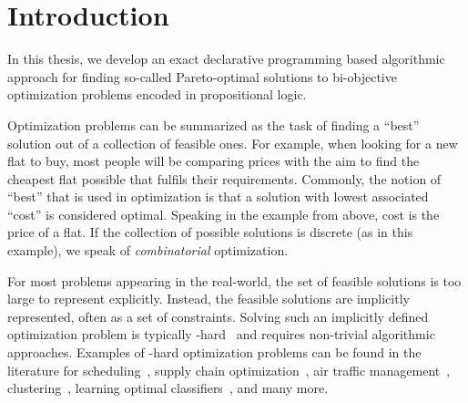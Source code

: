\chapter{Introduction\label{chap:intro}}

In this thesis, we develop an exact declarative programming based algorithmic approach for finding so-called Pareto-optimal solutions to bi-objective optimization problems encoded in propositional logic.

Optimization problems can be summarized as the task of finding a ``best'' solution out of a collection of feasible ones.
For example, when looking for a new flat to buy, most people will be comparing prices with the aim to find the cheapest flat possible that fulfils their requirements.
Commonly, the notion of ``best'' that is used in optimization is that a solution with lowest associated ``cost'' is considered optimal.
Speaking in the example from above, cost is the price of a flat.
If the collection of possible solutions is discrete (as in this example), we speak of \emph{combinatorial} optimization.

For most problems appearing in the real-world, the set of feasible solutions is too large to represent explicitly.
Instead, the feasible solutions are implicitly represented, often as a set of constraints.
Solving such an implicitly defined optimization problem is typically \NP-hard~\autocite{AroraBarak2009-complexity} and requires non-trivial algorithmic approaches.
Examples of \NP-hard optimization problems can be found in the literature for scheduling~\autocites{DBLP:conf/cp/Stojadinovic14,DBLP:conf/cpaior/BofillGSV15,DBLP:journals/ior/Solomon87,DBLP:journals/candie/AkyolB07}, supply chain optimization~\autocite{DBLP:journals/cce/Papageorgiou09}, air traffic management~\autocites{DBLP:journals/ior/BertsimasLO11,RichardsHow2002Aircrafttrajectoryplanning}, clustering~\autocite{DBLP:journals/ai/DaoDV17,DBLP:conf/sdm/DavidsonRS10}, learning optimal classifiers~\autocites{DBLP:conf/cp/MaliotovM18,DBLP:conf/ijcai/NarodytskaIPM18,DBLP:conf/ijcai/Hu0HH20,DBLP:conf/cp/YuISB20,DBLP:conf/aaai/DemirovicS21,DBLP:conf/cp/ShatiCM21,DBLP:conf/cade/IgnatievPNM18}, and many more.

